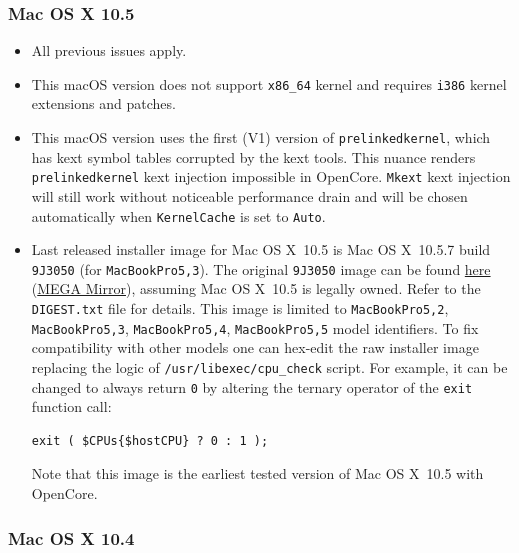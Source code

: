 \documentclass[]{article}
\begin{document}
\subsubsection{Mac OS X 10.5}\label{legacy105}

\begin{itemize}
  \item All previous issues apply.
  \item This macOS version does not support \texttt{x86\_64} kernel
    and requires \texttt{i386} kernel extensions and patches.
  \item This macOS version uses the first (V1) version of \texttt{prelinkedkernel},
    which has kext symbol tables corrupted by the kext tools. This nuance
    renders \texttt{prelinkedkernel} kext injection impossible in OpenCore.
    \texttt{Mkext} kext injection will still work without noticeable
    performance drain and will be chosen automatically when
    \texttt{KernelCache} is set to \texttt{Auto}.
  \item Last released installer image for Mac OS X~10.5 is Mac OS X~10.5.7
    build \texttt{9J3050} (for \texttt{MacBookPro5,3}). The original \texttt{9J3050} image can be found
    \href{https://archive.org/details/10.5.7-9-j-3050}{here}
    (\href{https://mega.nz/folder/inRBTarD#zanf7fUbviwz3WHBU5xpCg}{MEGA Mirror}),
    assuming Mac OS X~10.5 is legally owned. Refer to the \texttt{DIGEST.txt} file
    for details. This image is limited to \texttt{MacBookPro5,2}, \texttt{MacBookPro5,3},
    \texttt{MacBookPro5,4}, \texttt{MacBookPro5,5} model identifiers.
    To fix compatibility with other models one can hex-edit the raw installer image replacing
    the logic of \texttt{/usr/libexec/cpu\_check} script. For example, it can be changed
    to always return \texttt{0} by altering the ternary operator of the \texttt{exit} function call:
\begin{lstlisting}[label=hex105, style=ocbash]
exit ( $CPUs{$hostCPU} ? 0 : 1 );
\end{lstlisting}
    Note that this image is the earliest tested version of Mac OS X~10.5 with OpenCore.
\end{itemize}

\subsubsection{Mac OS X 10.4}\label{legacy104}
\end{document}
